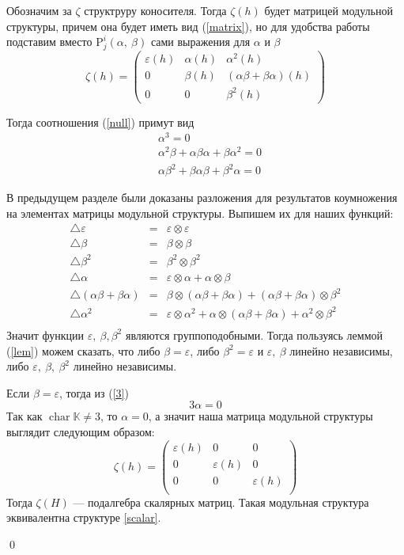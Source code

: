 \documentclass[12pt, reqno, a4paper, oneside, notitlepage]{amsart}
\makeatletter
\theoremstyle{mytheoremstyle}
\theoremstyle{myremarkstyle}
\numberwithin{equation}{section}
\renewenvironment{proof}[1][\proofname]{\par\indent {\bfseries #1\@addpunct{.} }}{\qed}
\DeclareMathOperator{\chr}{char}
\makeatother
\begin{document}
\begin{proof}
  Обозначим за $\zeta$ структруру коносителя. Тогда $\zeta(h)$ будет матрицей модульной структуры, причем она будет иметь вид (\ref{matrix}), но для удобства работы подставим вместо $\mathrm{P}^i_j(\alpha,\ \beta)$ сами выражения для $\alpha$ и $\beta$
    \[\zeta(h) = 
    \begin{pmatrix}
        \varepsilon(h) & \alpha(h) & \alpha^2(h)\\
         0 & \beta(h) & (\alpha\beta + \beta\alpha)(h) \\
         0 & 0 & \beta^2(h)
    \end{pmatrix}\]
  
  Тогда соотношения (\ref{null}) примут вид
    \begin{align}
        &\alpha^3 = 0 \label{1}\\
        &\alpha^2\beta+\alpha\beta\alpha + \beta\alpha^2 = 0 \label{2}\\
        &\alpha\beta^2+\beta\alpha\beta+\beta^2\alpha = 0 \label{3}
    \end{align}
    
    В предыдущем разделе были доказаны разложения для результатов коумножения на элементах матрицы модульной структуры. Выпишем их для наших функций:
    \begin{eqnarray*}
        \bigtriangleup\varepsilon &=& \varepsilon \otimes \varepsilon\\
		\bigtriangleup\beta &=& \beta \otimes \beta\\
		\bigtriangleup\beta^2 &=& \beta^2 \otimes \beta^2\\
        \bigtriangleup\alpha &=& \varepsilon \otimes \alpha + \alpha \otimes \beta\\
        \bigtriangleup(\alpha\beta+\beta\alpha) &=& \beta \otimes (\alpha\beta+\beta\alpha) + (\alpha\beta+\beta\alpha)\otimes \beta^2\\
        \bigtriangleup\alpha^2 &=& \varepsilon \otimes \alpha^2 + \alpha \otimes (\alpha\beta+\beta\alpha) + \alpha^2 \otimes \beta^2\\
    \end{eqnarray*}
	Значит функции $\varepsilon,\ \beta, \beta^2$ являются группоподобными. Тогда пользуясь леммой (\ref{lem}) можем сказать, что либо $\beta = \varepsilon$, 
	либо $\beta^2 = \varepsilon$ и $\varepsilon,\ \beta$ линейно независимы, либо $\varepsilon,\ \beta,\ \beta^2$ линейно независимы.

	Если $\beta = \varepsilon$, тогда из (\ref{3}) 
	\[
	  3\alpha = 0
	\]
	Так как $\chr \mathbb{K} \neq 3$, то $\alpha = 0$, а значит наша матрица модульной структуры выглядит следующим образом:\[
    \zeta(h) = \begin{pmatrix}
        \varepsilon(h) & 0 & 0\\
        0 & \varepsilon(h) & 0\\
        0 & 0 & \varepsilon(h)\\
    \end{pmatrix}
    \]
    Тогда $\zeta(H)$ --- подалгебра скалярных матриц. Такая модульная структура эквивалентна структуре \ref{scalar}.


\end{proof}
\end{document}

